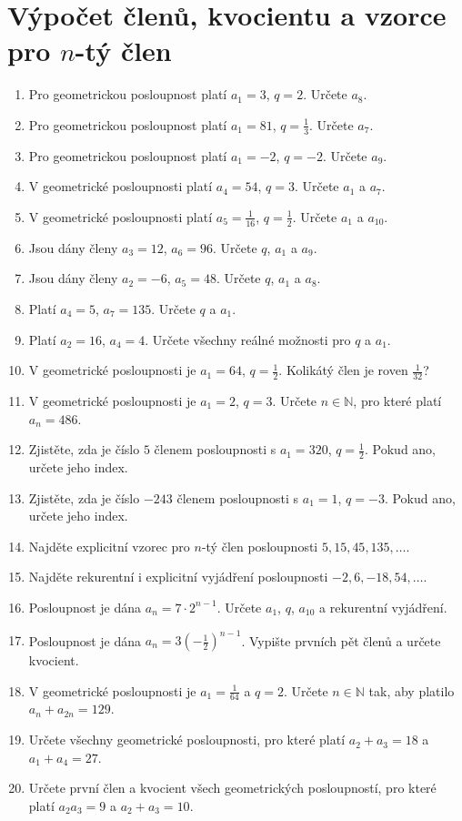 \documentclass[12pt,a4paper]{article}
\begin{document}
\section*{Výpočet členů, kvocientu a vzorce pro $n$-tý člen}
\begin{enumerate}[label=\arabic*.,start=16]
    \item Pro geometrickou posloupnost platí $a_1=3$, $q=2$. Určete $a_8$.
    \item Pro geometrickou posloupnost platí $a_1=81$, $q=\frac13$. Určete $a_7$.
    \item Pro geometrickou posloupnost platí $a_1=-2$, $q=-2$. Určete $a_9$.
    \item V geometrické posloupnosti platí $a_4=54$, $q=3$. Určete $a_1$ a $a_7$.
    \item V geometrické posloupnosti platí $a_5=\frac1{16}$, $q=\frac12$. Určete $a_1$ a $a_{10}$.
    \item Jsou dány členy $a_3=12$, $a_6=96$. Určete $q$, $a_1$ a $a_9$.
    \item Jsou dány členy $a_2=-6$, $a_5=48$. Určete $q$, $a_1$ a $a_8$.
    \item Platí $a_4=5$, $a_7=135$. Určete $q$ a $a_1$.
    \item Platí $a_2=16$, $a_4=4$. Určete všechny reálné možnosti pro $q$ a $a_1$.
    \item V geometrické posloupnosti je $a_1=64$, $q=\frac12$. Kolikátý člen je roven $\frac1{32}$?
    \item V geometrické posloupnosti je $a_1=2$, $q=3$. Určete $n\in\mathbb N$, pro které platí $a_n=486$.
    \item Zjistěte, zda je číslo $5$ členem posloupnosti s $a_1=320$, $q=\frac12$. Pokud ano, určete jeho index.
    \item Zjistěte, zda je číslo $-243$ členem posloupnosti s $a_1=1$, $q=-3$. Pokud ano, určete jeho index.
    \item Najděte explicitní vzorec pro $n$-tý člen posloupnosti $5,15,45,135,\ldots$.
    \item Najděte rekurentní i explicitní vyjádření posloupnosti $-2,6,-18,54,\ldots$.
    \item Posloupnost je dána $a_n=7\cdot2^{n-1}$. Určete $a_1$, $q$, $a_{10}$ a rekurentní vyjádření.
    \item Posloupnost je dána $a_n=3\left(-\frac12\right)^{n-1}$. Vypište prvních pět členů a určete kvocient.
    \item V geometrické posloupnosti je $a_1=\frac1{64}$ a $q=2$. Určete $n\in\mathbb N$ tak, aby platilo $a_n+a_{2n}=129$.
    \item Určete všechny geometrické posloupnosti, pro které platí $a_2+a_3=18$ a $a_1+a_4=27$.
    \item Určete první člen a kvocient všech geometrických posloupností, pro které platí $a_2a_3=9$ a $a_2+a_3=10$.
\end{enumerate}
\end{document}
